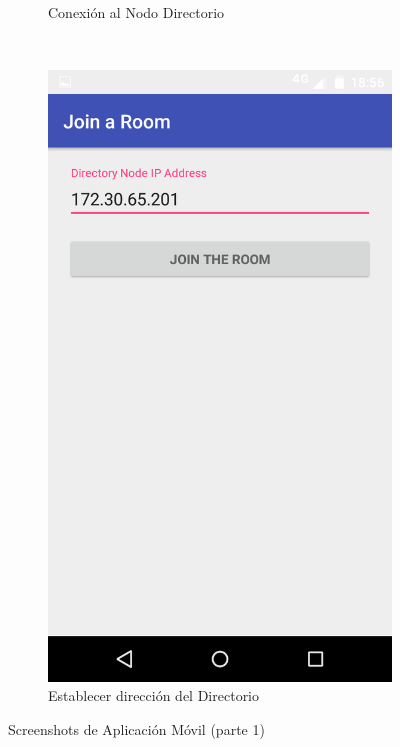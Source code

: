 \begin{figure}[h]
\begin{subfigure}[b]{0.4\textwidth}
        \caption{Conexión al Nodo Directorio}
        \label{fig:mobile_connect}
    \end{subfigure}
    ~ %
    \begin{subfigure}[b]{0.4\textwidth}
        \includegraphics[width=\textwidth]{imagenes/mobile_connect.png}
        \caption{Establecer dirección del Directorio}
        \label{fig:mobile_set_ip}
    \end{subfigure}
    \caption{Screenshots de Aplicación Móvil (parte 1)}\label{fig:mobile_screenshots_1}
\end{figure}

